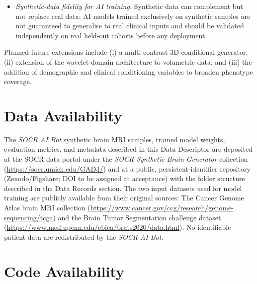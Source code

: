 \documentclass[11pt]{article}
\begin{document}
\begin{itemize}
  \item \emph{Synthetic-data fidelity for AI training.} Synthetic data can complement but not replace real data; AI models trained exclusively on synthetic samples are not guaranteed to generalise to real clinical inputs and should be validated independently on real held-out cohorts before any deployment.
\end{itemize}

Planned future extensions include (i) a multi-contrast 3D conditional generator, (ii) extension of the wavelet-domain architecture to volumetric data, and (iii) the addition of demographic and clinical conditioning variables to broaden phenotype coverage.

\section*{Data Availability}
\label{sec:dataavail}

The \emph{SOCR AI Bot} synthetic brain MRI samples, trained model weights, evaluation metrics, and metadata described in this Data Descriptor are deposited at the SOCR data portal under the \emph{SOCR Synthetic Brain Generator} collection (\url{https://socr.umich.edu/GAIM/}) and at a public, persistent-identifier repository (Zenodo/Figshare; DOI to be assigned at acceptance) with the folder structure described in the Data Records section. The two input datasets used for model training are publicly available from their original sources: The Cancer Genome Atlas brain MRI collection (\url{https://www.cancer.gov/ccg/research/genome-sequencing/tcga})\cite{cancergenomeatlas2013} and the Brain Tumor Segmentation challenge dataset (\url{https://www.med.upenn.edu/cbica/brats2020/data.html})\cite{bakas2017advancing,bakas2018identifying,menze2015multimodal}. No identifiable patient data are redistributed by the \emph{SOCR AI Bot}.

\section*{Code Availability}
\label{sec:codeavail}
\end{document}
